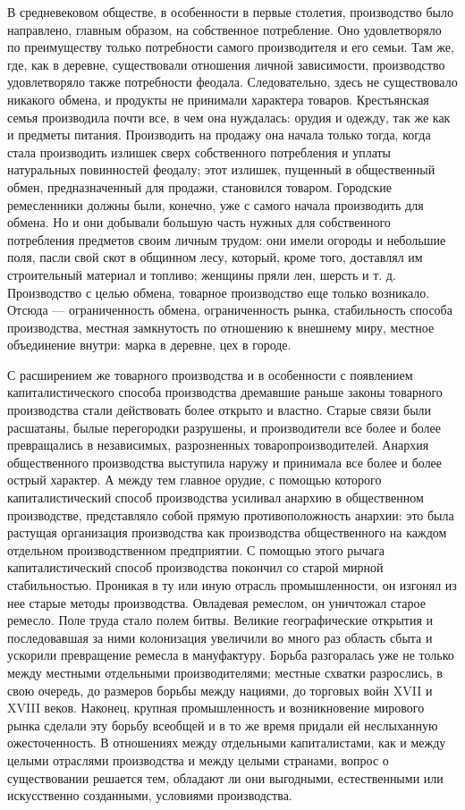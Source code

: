 \documentclass[12pt]{article}
\newcommand{\parnum}{(\arabic{parcount})}
\newcounter{parcount}
\newenvironment{parnumbers}{%
  \par%
  \everypar{\noindent \stepcounter{parcount}\marginpar[]{\parnum}}%
}{}
\begin{document}
\begin{parnumbers}
    В средневековом обществе, в особенности в первые столетия, производство было направлено, главным образом, на собственное потребление. Оно удовлетворяло по преимуществу только потребности самого производителя и его семьи. Там же, где, как в деревне, существовали отношения личной зависимости, производство удовлетворяло также потребности феодала. Следовательно, здесь не существовало никакого обмена, и продукты не принимали характера товаров. Крестьянская семья производила почти все, в чем она нуждалась: орудия и одежду, так же как и предметы питания. Производить на продажу она начала только тогда, когда стала производить излишек сверх собственного потребления и уплаты натуральных повинностей феодалу; этот излишек, пущенный в общественный обмен, предназначенный для продажи, становился товаром. Городские ремесленники должны были, конечно, уже с самого начала производить для обмена. Но и они добывали большую часть нужных для собственного потребления предметов своим личным трудом: они имели огороды и небольшие поля, пасли свой скот в общинном лесу, который, кроме того, доставлял им строительный материал и топливо; женщины пряли лен, шерсть и т. д. Производство с целью обмена, товарное производство еще только возникало. Отсюда — ограниченность обмена, ограниченность рынка, стабильность способа производства, местная замкнутость по отношению к внешнему миру, местное объединение внутри: марка в деревне, цех в городе.

    С расширением же товарного производства и в особенности с появлением капиталистического способа производства дремавшие раньше законы товарного производства стали действовать более открыто и властно. Старые связи были расшатаны, былые перегородки разрушены, и производители все более и более превращались в независимых, разрозненных товаропроизводителей. Анархия общественного производства выступила наружу и принимала все более и более острый характер. А между тем главное орудие, с помощью которого капиталистический способ производства усиливал анархию в общественном производстве, представляло собой прямую противоположность анархии: это была растущая организация производства как производства общественного на каждом отдельном производственном предприятии. С помощью этого рычага капиталистический способ производства покончил со старой мирной стабильностью. Проникая в ту или иную отрасль промышленности, он изгонял из нее старые методы производства. Овладевая ремеслом, он уничтожал старое ремесло. Поле труда стало полем битвы. Великие географические открытия и последовавшая за ними колонизация увеличили во много раз область сбыта и ускорили превращение ремесла в мануфактуру. Борьба разгоралась уже не только между местными отдельными производителями; местные схватки разрослись, в свою очередь, до размеров борьбы между нациями, до торговых войн XVII и XVIII веков. Наконец, крупная промышленность и возникновение мирового рынка сделали эту борьбу всеобщей и в то же время придали ей неслыханную ожесточенность. В отношениях между отдельными капиталистами, как и между целыми отраслями производства и между целыми странами, вопрос о существовании решается тем, обладают ли они выгодными, естественными или искусственно созданными, условиями производства.


\end{parnumbers}
\end{document}

